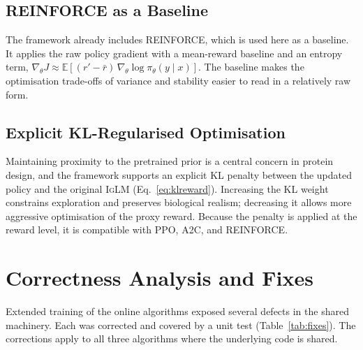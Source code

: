 \documentclass[11pt]{article}
\newcommand{\iglm}{\textsc{IgLM}}
\begin{document}
\subsection{REINFORCE as a Baseline}
The framework already includes REINFORCE, which is used here as a baseline. It
applies the raw policy gradient with a mean-reward baseline and an entropy term,
$\nabla_\theta J \approx \mathbb{E}[(r'-\bar r)\,\nabla_\theta\log\pi_\theta(y\mid x)]$.
The baseline makes the optimisation trade-offs of variance and stability easier to
read in a relatively raw form.

\subsection{Explicit KL-Regularised Optimisation}
Maintaining proximity to the pretrained prior is a central concern in protein
design, and the framework supports an explicit KL penalty between the updated
policy and the original \iglm{} (Eq.~\ref{eq:klreward}). Increasing the KL weight
constrains exploration and preserves biological realism; decreasing it allows more
aggressive optimisation of the proxy reward. Because the penalty is applied at the
reward level, it is compatible with PPO, A2C, and REINFORCE.

\section{Correctness Analysis and Fixes}
Extended training of the online algorithms exposed several defects in the shared
machinery. Each was corrected and covered by a unit test (Table~\ref{tab:fixes}).
The corrections apply to all three algorithms where the underlying code is shared.
\end{document}
